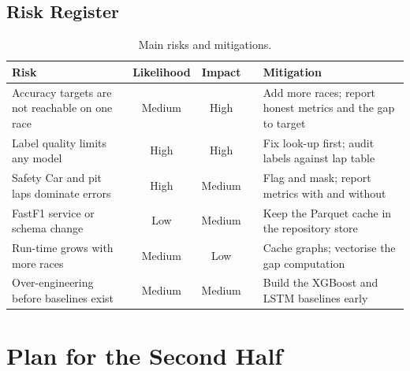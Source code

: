 \documentclass[11pt,a4paper]{article}
\begin{document}
\subsection{Risk Register}
\begin{table}[H]
\centering
\caption{Main risks and mitigations.}
\label{tab:risks}
\small
\begin{tabularx}{\linewidth}{@{}Xccc X@{}}
\toprule
\textbf{Risk} & \textbf{Likelihood} & \textbf{Impact} & & \textbf{Mitigation} \\
\midrule
Accuracy targets are not reachable on one race & Medium & High & & Add more races; report honest metrics and the gap to target \\
Label quality limits any model & High & High & & Fix look-up first; audit labels against lap table \\
Safety Car and pit laps dominate errors & High & Medium & & Flag and mask; report metrics with and without \\
FastF1 service or schema change & Low & Medium & & Keep the Parquet cache in the repository store \\
Run-time grows with more races & Medium & Low & & Cache graphs; vectorise the gap computation \\
Over-engineering before baselines exist & Medium & Medium & & Build the XGBoost and LSTM baselines early \\
\bottomrule
\end{tabularx}
\end{table}

\section{Plan for the Second Half}
\label{sec:future}
\end{document}
